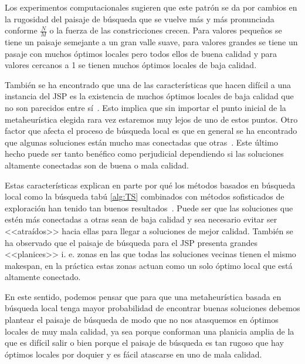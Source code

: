 Los experimentos computacionales sugieren que este patrón se da por cambios en la rugosidad del paisaje de búsqueda que se vuelve más y más pronunciada conforme $\frac{N}{M}$ 
o la fuerza de las constricciones crecen.
%
Para valores pequeños se tiene un paisaje semejante a un gran valle suave, para valores grandes se tiene un pasaje con muchos óptimos locales pero todos ellos de buena calidad y 
para valores cercanos a 1 se tienen muchos óptimos locales de baja calidad.

También se ha encontrado que una de las características que hacen difícil a una instancia del JSP es la existencia de muchos óptimos locales de baja calidad que no son 
parecidos entre sí~\cite{mattfeld1999search}. 
%
Esto implica que sin importar el punto inicial de la metaheurística elegida rara vez estaremos muy lejos de uno de estos puntos. 
%
Otro factor que afecta el proceso de búsqueda local es que en general se ha encontrado que algunas soluciones están mucho mas conectadas que otras~\cite{bierwirth2004landscape}. 
%
Este último hecho puede ser tanto benéfico como perjudicial dependiendo si las soluciones altamente conectadas son de buena o mala calidad. 


Estas características explican en parte por qué los métodos basados en búsqueda local como la búsqueda tabú \ref{alg:TS} combinados con métodos sofisticados de exploración 
han tenido tan buenos resultados~\cite{watson2003problem}. 
%
Puede ser que las soluciones que estén más conectadas a otras sean de baja calidad y sea necesario evitar ser <<atraídos>> hacia ellas para llegar a soluciones de mejor calidad. 
%
También se ha observado que el paisaje de búsqueda para el JSP presenta grandes <<planices>> i. e. zonas en las que todas las soluciones vecinas tienen el mismo makespan, 
en la práctica estas zonas actuan como un solo óptimo local que está altamente conectado.

En este sentido, podemos pensar que para que una metaheurística basada en búsqueda local tenga mayor probabilidad de encontrar buenas soluciones 
debemos plantear el paisaje de búsqueda de modo que no nos atasquemos en óptimos locales de muy mala calidad, ya sea porque conforman una planicia
amplia de la que es difícil salir o bien porque el paisaje de búsqueda es tan rugoso que hay óptimos locales por doquier y es fácil atascarse en uno de 
mala calidad. 


